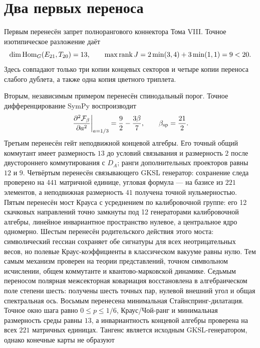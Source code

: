 \section{Два первых переноса}

Первым перенесён запрет полнорангового коннектора Тома VIII. Точное
изотипическое разложение даёт
\begin{equation}
 \dim\operatorname{Hom}_G(E_{21},T_{20})=13,
 \qquad
 \max\operatorname{rank} J=2\min(3,4)+3\min(1,1)=9<20.
 \label{eq:v8-proofdsl-connector-exact}
\end{equation}
Здесь совпадают только три копии концевых секторов и четыре копии переноса слабого
дублета, а также одна копия цветного триплета.

Вторым, независимым примером перенесён спинодальный порог. Точное
дифференцирование SymPy воспроизводит
\begin{equation}
 \left.\frac{\partial^2\mathcal F_\beta}{\partial a^2}\right|_{a=1/3}
 =\frac92-\frac{3\beta}{7},
 \qquad
 \beta_{\rm sp}=\frac{21}{2}.
 \label{eq:v8-proofdsl-spinodal-exact}
\end{equation}
Третьим перенесён гейт неподвижной концевой алгебры. Его точный общий
коммутант имеет размерность $13$ до условий связывания и размерность $2$ после
двустороннего коммутирования с $D_A$; ранги дополнительных проекторов равны
$12$ и $9$. Четвёртым перенесён связывающего GKSL генератор: сохранение следа
проверено на $441$ матричной единице, угловая формула --- на базисе из
$221$ элементов, а неподвижная размерность $41$ получена точной
нульмерностью. Пятым перенесён мост Крауса с усреднением по калибровочной группе: его 12 скачковых
направлений точно замкнуты под 12 генераторами калибровочной алгебры, линейное
инвариантное пространство нулевое, а центральное ядро одномерно. Шестым
перенесён родительского действия этого моста: символический гессиан сохраняет
обе сигнатуры для всех неотрицательных весов, но полевые Краус-коэффициенты
в классическом вакууме равны нулю. Тем самым механизм проверен на теории
представлений, точном символьном исчислении, общем коммутанте и
квантово-марковской динамике. Седьмым переносом полярная межсекторная ковариация
восстановлена в алгебраическом поле степени шесть: получены шесть точных
пар, нулевой внешний угол и общая спектральная ось.
Восьмым перенесена минимальная Стайнспринг-дилатация. Точное окно шага равно
$0\le p\le1/6$, Краус/Чой-ранг и минимальная размерность среды равны $13$,
а инвариантность концевой алгебры проверена на всех $221$ матричных единицах.
Тангенс является исходным GKSL-генератором, однако конечные карты не образуют
